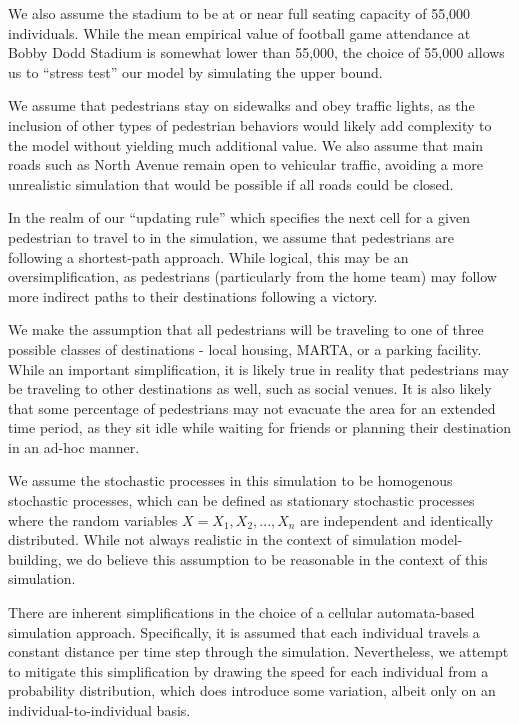 \documentclass[12pt]{article}
\begin{document}
We also assume the stadium to be at or near full seating capacity of 55,000
individuals. While the mean empirical value of football game attendance at
Bobby Dodd Stadium is somewhat lower than 55,000, the choice
of 55,000 allows us to ``stress test'' our model by simulating the upper bound.

We assume that pedestrians stay on sidewalks and obey traffic lights, as the
inclusion of other types of pedestrian behaviors would likely add complexity
to the model without yielding much additional value. We also assume that main
roads such as North Avenue remain open to vehicular traffic, avoiding a more
unrealistic simulation that would be possible if all roads could be closed.

In the realm of our ``updating rule'' which specifies the next cell for a given
pedestrian to travel to in the simulation, we assume that pedestrians are
following a shortest-path approach. While logical, this may be an
oversimplification, as pedestrians (particularly from the home team) may follow
more indirect paths to their destinations following a victory.

We make the assumption that all pedestrians will be traveling to one of three
possible classes of destinations - local housing, MARTA, or a parking facility.
While an important simplification, it is likely true in reality that pedestrians
may be traveling to other destinations as well, such as social venues. It is
also likely that some percentage of pedestrians may not evacuate the area for
an extended time period, as they sit idle while waiting for friends or planning
their destination in an ad-hoc manner.

We assume the stochastic processes in this simulation to be homogenous
stochastic processes, which can be defined as stationary stochastic processes
where the random variables $X = X_1, X_2, ..., X_n$ are independent and
identically distributed. While not always realistic in the context of
simulation model-building, we do believe this assumption to be reasonable in
the context of this simulation.

There are inherent simplifications in the choice of a cellular automata-based
simulation approach. Specifically, it is assumed that each individual travels
a constant distance per time step through the simulation. Nevertheless, we
attempt to mitigate this simplification by drawing the speed for each
individual from a probability distribution, which does introduce some
variation, albeit only on an individual-to-individual basis.
\end{document}
